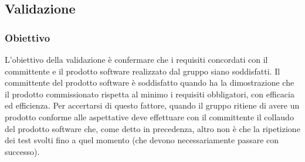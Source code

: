 \subsection{Validazione}
\subsubsection{Obiettivo}
L’obiettivo della validazione è confermare che i requisiti concordati con il committente e il prodotto software realizzato dal gruppo siano soddisfatti.
Il committente del prodotto software è soddisfatto quando ha la dimostrazione che il prodotto commissionato rispetta al minimo i requisiti obbligatori, con efficacia ed efficienza.
Per accertarsi di questo fattore, quando il gruppo ritiene di avere un prodotto conforme alle aspettative deve effettuare con il committente il collaudo del prodotto software che, come detto in precedenza, altro non è che la ripetizione dei test svolti fino a quel momento (che devono necessariamente passare con successo).

